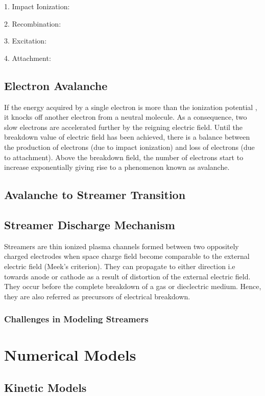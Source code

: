 1. Impact Ionization:

2. Recombination:

3. Excitation:

4. Attachment:



\section{Electron Avalanche}

If the energy acquired by a single electron is more than the ionization potential , it knocks off another electron from a neutral molecule. As a consequence, two slow electrons are accelerated further by the reigning electric field. Until the breakdown value of electric field has been achieved, there is a balance between the production of electrons (due to impact ionization) and loss of electrons (due to attachment). Above the breakdown field, the number of electrons start to increase exponentially giving rise to a phenomenon known as avalanche.

\section{Avalanche to Streamer Transition}


\section{Streamer Discharge Mechanism}

Streamers are thin ionized plasma channels formed between two oppositely charged electrodes when space charge field become comparable to the external electric field (Meek's criterion). They can propagate to either direction i.e towards anode or cathode as a result of distortion of the external electric field. They occur before the complete breakdown of a gas or dieclectric medium. Hence, they are also referred as precursors of electrical breakdown.  

\subsection{Challenges in Modeling Streamers}




\chapter{Numerical Models}

\section{Kinetic Models}

